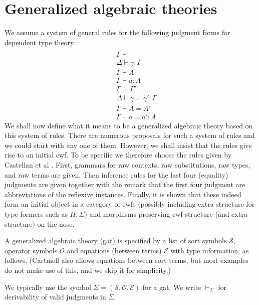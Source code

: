 \documentclass{lmcs}
\def\Sort{\mathcal{S}}
\def\Op{\mathcal{O}}
\def\Eq{\mathcal{E}}
\begin{document}
\section{Generalized algebraic theories}

We assume a system of general rules for the following judgment forms for dependent type theory:
\begin{eqnarray*}
\\&&\Gamma \vdash
\\&&\Delta \vdash \gamma : \Gamma
\\&&\Gamma \vdash A
\\&&\Gamma \vdash a : A
\\&&\Gamma = \Gamma' \vdash
\\&&\Delta \vdash \gamma = \gamma' : \Gamma
\\&&\Gamma \vdash A = A'
\\&&\Gamma \vdash a = a' : A
\end{eqnarray*}
We shall now define what it means to be a generalized algebraic theory based on this system of rules. There are numerous proposals for such a system of rules and we could start with any one of them. However, we shall insist that the rules give rise to an initial cwf. To be specific we therefore choose the rules given by Castellan et al \cite{castellan:tlca2015}. First, grammars for raw contexts, raw substitutions, raw types, and raw terms are given. Then inference rules for the last four (equality) judgments are given together with the remark that the first four judgment are abbreviations of the reflexive instances. Finally, it is shown that these indeed form an initial object in a category of cwfs (possibly including extra structure for type formers such as $\Pi, \Sigma$) and morphisms preserving cwf-structure (and extra structure) on the nose.

A generalized algebraic theory (gat)  is specified by a list of sort symbols $\Sort$, operator symbols $\Op$ and equations (between terms) $\Eq$ with type information, as follows. (Cartmell also allows equations between sort terms, but most examples do not make use of this, and we skip it for simplicity.)

We typically use the symbol $\Sigma = (\Sort, \Op, \Eq)$ for a gat. We write $\vdash_\Sigma$ for derivability of valid judgments in $\Sigma$.

\end{document}
